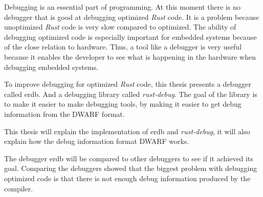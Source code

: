Debugging is an essential part of programming.
At this moment there is no debugger that is good at debugging optimized \emph{Rust} code.
It is a problem because unoptimized \emph{Rust} code is very slow compared to optimized.
The ability of debugging optimized code is especially important for embedded systems because of the close relation to hardware.
Thus, a tool like a debugger is very useful because it enables the developer to see what is happening in the hardware when debugging embedded systems.


To improve debugging for optimized \emph{Rust} code, this thesis presents a debugger called \acrshort{erdb}.
And a debugging library called \emph{rust-debug}.
The goal of the library is to make it easier to make debugging tools, by making it easier to get debug information from the \gls{DWARF} format.


This thesis will explain the implementation of \acrshort{erdb} and \emph{rust-debug}, it will also explain how the debug information format \acrshort{DWARF} works.


The debugger \acrshort{erdb} will be compared to other debuggers to see if it achieved its goal.
Comparing the debuggers showed that the biggest problem with debugging optimized code is that there is not enough debug information produced by the compiler.


